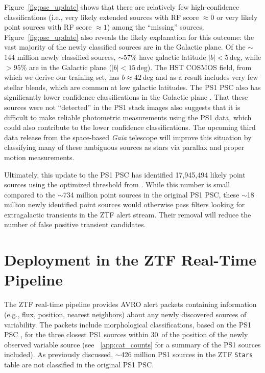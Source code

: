 \documentclass[twocolumn]{aastex63}
\begin{document}
Figure~\ref{fig:psc_update} shows that there are relatively few
high-confidence classifications (i.e., very likely extended sources with RF
score $\approx 0$ or very likely point sources with RF score $\approx 1$)
among the ``missing'' sources. Figure~\ref{fig:psc_update} also reveals the
likely explanation for this outcome: the vast majority of the newly classified
sources are in the Galactic plane. Of the $\sim$144 million newly classified
sources, $\sim$57\% have galactic latitude $\lvert b \rvert < 5$\,deg, while
$> 95$\% are in the Galactic plane ($\lvert b \rvert < 15$\,deg). The HST
COSMOS field, from which we derive our training set, has $b \approx 42$\,deg
and as a result includes very few stellar blends, which are common at low
galactic latitudes. The PS1 PSC also has significantly lower confidence
classifications in the Galactic plane \citep[see Figure~8 in][]{Tachibana18}.
That these sources were not ``detected'' in the PS1 stack images also suggests
that it is difficult to make reliable photometric measurements using the PS1
data, which could also contribute to the lower confidence classifications. The
upcoming third data release from the space-based \textit{Gaia} telescope
\citep{Perryman01} will improve this situation by classifying many of these
ambiguous sources as stars via parallax and proper motion measurements.

Ultimately, this update to the PS1 PSC has identified 17,945,494 likely point
sources using the optimized threshold from \citet[][RF score $\ge
0.83$]{Tachibana18}. While this number is small compared to the $\sim$734
million point sources in the original PS1 PSC, these $\sim$18 million newly
identified point sources would otherwise pass filters looking for
extragalactic transients in the ZTF alert stream. Their removal will reduce
the number of false positive transient candidates.

\section{Deployment in the ZTF Real-Time Pipeline}\label{sec:ztf_pipeline}

The ZTF real-time pipeline \citep{Masci19} provides AVRO alert packets
\citep[see][]{Patterson19} containing information (e.g., flux, position,
nearest neighbors) about any newly discovered sources of variability. The
packets include morphological classifications, based on the PS1 PSC
\citep{Tachibana18}, for the three closest PS1 sources within 30\arcsec\ of
the position of the newly observed variable source (see ~\ref{app:cat_counts}
for a summary of the PS1 sources included). As previously discussed, $\sim$426
million PS1 sources in the ZTF \texttt{Stars} table are not classified in the
original PS1 PSC.
\end{document}
